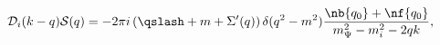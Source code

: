 \begin{equation}
\label{eq:produkt}
  \mathcal{D}_i(k-q)\mathcal{S}(q)=
  -2\pi i\left(\qslash+m+\Sigma'(q)\right)
  \delta(q^2-m^2)\frac{\nb{q_0}+\nf{q_0}}{m_\Psi^2-m_i^2-2qk},
\end{equation}

